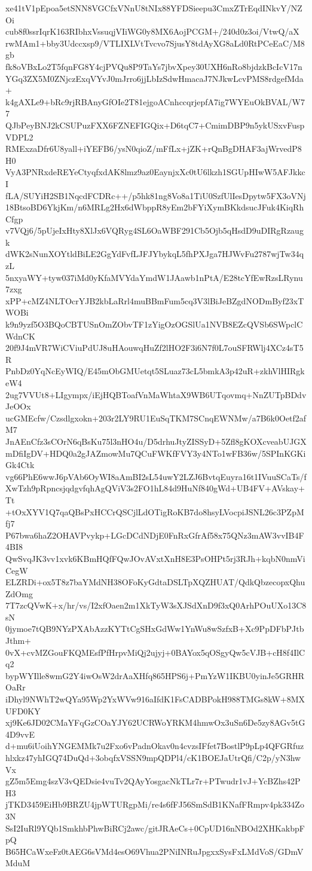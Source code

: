 xe41tV1pEpoa5etSNN8VGCfxVNnU8tNIx88YFDSieepu3CmxZTrEqdINkvY/NZOi
cub8f0ssrIqrK163RIbhxVssuqjVIiWG0y8MX6AojPCGM+/240d0z3oi/VtwQ/aX
rwMAm1+bby3Udccxsp9/VTLIXLVtTvcvo7SjusY8tdAyXG8aLd0RtPCeEaC/M8gb
fk8oVBxLo2T5fqnFG8Y4cjPVQu8P9TaYs7jbvXpey30UXH6nRo8bjdzkBcIcV17n
YGq3ZX5M0ZNjczExqVYvJ0mJrro6jjLbIzSdwHmacaJ7NJkwLcvPMS8rdgefMda+
k4gAXLe9+bRc9rjRBAnyGfOIe2T81ejgoACnhccqrjepfA7ig7WYEuOkBVAL/W77
QJbPeyBNJ2kCSUPuzFXX6FZNEFIGQix+D6tqC7+CmimDBP9n5ykUSxvFuspVDPL2
RMExzaDfr6U8yall+iYEFB6/ysN0qioZ/mFfLx+jZK+rQnBgDHAF3ajWrvedP8H0
VyA3PNRxdeREYeCtyqfxdAK8lmz9az0EaynjxXc0tU6lkzh1SGUpHIwW5AFJkkcI
fLA/SUYiH2SB1NqcdFCDRc++/p5hk81ng8Vo8a1TiU0SzfUlIesDpytw5FX3oVNj
18BtsoBD6YkjKm/n6MRLg2Hx6dWbppR8yEm2bFYiXymBKkdsucJFuk4KiqRhCfgp
v7VQj6/5pUjeIxHty8XlJx6VQRyg4SL6OaWBF291Cb5Ojb5qHsdD9uDIRgRzaugk
dWK2sNunXOYtldBiLE2GgYdFvfLJFJYbykqL5fhPXJga7HJWvFu2787wjTw34qzL
5nxyaWY+tyw037iMd0yKfaMVYdaYmdW1JAawb1nPtA/E28tcYfEwRzsLRynu7zxg
xPP+cMZ4NLTOcrYJB2kbLaRrl4muBBmFum5cq3V3lBiJeBZgdNODmByf23xTWOBi
k9n9yzf5O3BQoCBTUSnOmZObvTF1zYigOzOGSlUa1NVB8EZcQVSb6SWpclCWdnCK
20f9J4mVR7WiCViuPdUJ8uHAouwqHuZf2lHO2F3i6N7f0L7ouSFRWlj4XCz4sT5R
PnbDz0YqNcEyWIQ/E45mObGMUetqt5SLuaz73cL5bmkA3p42uR+zkhVlHIRgkeW4
2ug7VVUt8+LIgympx/iEjHQBToafVnMaWhtaX9WB6UTqovmq+NnZUTpBDdvJeOOx
ucGMEcfw/Czsdlgxokn+203r2LY9RU1EuSqTKM7SCnqEWNMw/a7B6k0Oetf2afM7
JnAEnCfz3sCOrN6qBsKu75l3nHO4u/D5drhuJtyZISSyD+5Zfl8gKOXcveabUJGX
mDfiIgDV+HDQ0a2gJAZmowMu7QCuFWKfFVY3y4NTo1wFB36w/5SPInKGKiGk4Ctk
vg66PhE6wwJ6pVAb6OyWI8aAmBI2sL54uwY2LZJ6BvtqEuyra16t1IVuuSCaTs/f
XwTzh9pRpncsjqdgvfqhAgQViV3s2FO1hL84d9HuNf840gWd+UB4FV+AVskay+Tt
+tOxXYV1Q7qaQBsPxHCCrQSCjlLdOTigRoKB7do8hsyLVocpiJSNL26c3PZpMfj7
P67bwa6haZ2OHAVPvykp+LGcDCdNDjE0FnRxGfrAf58x75QNz3mAW3vvIB4F4BI8
QwSvqJK3vv1xvk6KBmHQfFQwJOvAVxtXnH8E3PsOHPt5rj3RJh+kqbN0nmViCegW
ELZRDi+ox5T8z7baYMdNH38OFoKyGdtaDSLTpXQZHUAT/QdkQbzecopxQhuZdOmg
7T7zcQVwK+x/hr/vs/I2xfOaen2m1XkTyW3sXJSdXnD9f3xQ0ArhPOuUXo13C8sN
0jymoe7tQB9NYzPXAbAzzKYTtCgSHxGdWw1YnWu8wSzfxB+Xc9PpDFbPJtbJthm+
0vX+cvMZGouFKQMEsfPfHrpvMiQj2ujyj+0BAYox5qOSgyQw5cVJB+cH8f4IlCq2
bypWYIlle8wmG2Y4iwOsW2drAaXHfq865HPS6j+PmYzW1IKBU0yinJe5GRHROaRr
iDhyl9NWhT2wQYa95Wp2YxWVw916aIfdK1FsCADBPokH988TMGs8kW+8MXUFD0KY
xj9Ke6JD02CMaYFqGzCOaYJY62UCRWoYRKM4hmwOx3uSn6De5zy8AGv5tG4D9vvE
d+mu6iUoihYNGEMMk7u2Fxo6vPadnOkav0n4cvzsIFfet7BostlP9pLp4QFGRfuz
hlxkz47yhIGQ74DuQd+3obqfxVSSN9mpQDPl4/cK1BOEJaUtrQfi/C2p/yN3hwVx
gZ5m5Emg4szV3vQEDsie4vuTv2QAyYosgacNkTLr7r+PTwudr1vJ+YcBZhs42PH3
jTKD3459EiHb9BRZU4jpWTURgpMi/re4s6fFJ56SmSdB1KNafFRmpv4pk334Zo3N
SsI2IuRl9YQb1SmkhbPhwBiRCj2awc/gitJRAeCs+0CpUD16nNBOd2XHKakbpFpQ
B65HCaWxeFz0tAEG6sVMd4esO69Vhua2PNiINRuJpgxxSysFxLMdVoS/GDmVMduM
